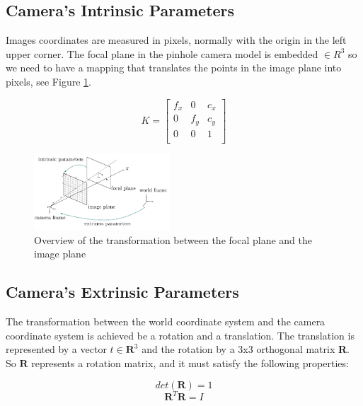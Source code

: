 \subsection{Camera's Intrinsic Parameters}
Images coordinates are measured in pixels, normally with the origin in the left upper corner. The focal
plane in the pinhole camera model is embedded $\in R^{3}$ so we need to have a mapping that translates
the points in the image plane into pixels, see Figure \ref{fig:intrinsic}.

\begin{equation}\label{eq2}
   K=
    \left[ {\begin{array}{cccc}
   f_{x} & 0 & c_{x} \\
   0 & f_{y} & c_{y} \\
   0 & 0 & 1\\

  \end{array} } \right]    
\end{equation}



\begin{figure}[!h]
\begin{center}
\includegraphics[width=2in]{figures02/intrinsic.png}
\caption{Overview of the transformation between the focal plane and the image plane}%
\label{fig:intrinsic}
\end{center}
\end{figure}


\subsection{Camera's Extrinsic Parameters}

The transformation between the world coordinate system and the camera coordinate system is achieved be a rotation and a translation. The translation is represented by a vector $t \in \textbf{R}^{3}$ and the rotation by a 3x3 orthogonal matrix \textbf{R}. So $\textbf{R}$ represents a rotation matrix, and it must satisfy the following properties:

\begin{equation}\label{eq3} 
     det(\textbf{R})=1 
\end{equation}
\begin{equation}\label{eq4}  
    \textbf{R}^{T}\textbf{R}=I      
\end{equation}


